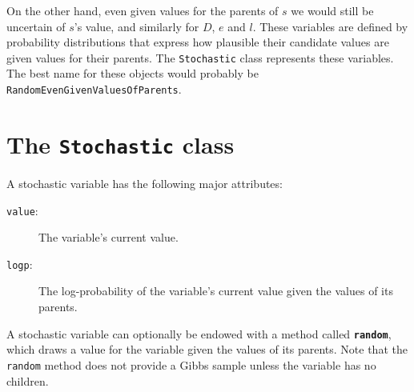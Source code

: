 On the other hand, even given values for the parents of $s$ we would still be uncertain of $s$'s value, and similarly for $D$, $e$ and $l$. These variables are defined by probability distributions that express how plausible their candidate values are given values for their parents. The \texttt{Stochastic} class represents these variables. The best name for these objects would probably be \texttt{RandomEvenGivenValuesOfParents}.
 

\section{The \texttt{Stochastic} class}

A stochastic variable has the following major attributes: 
\begin{description}
    \item[\texttt{value}:] The variable's current value.
    \item[\texttt{logp}:] The log-probability of the variable's current value given the values of its parents.
\end{description}
A stochastic variable can optionally be endowed with a method called \texttt{\bfseries random}, which draws a value for the variable given the values of its parents. Note that the \texttt{random} method does not provide a Gibbs sample unless the variable has no children.

